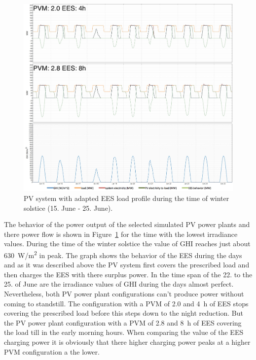 \begin{figure}[!bhtp]  
\centering
\includegraphics[width=1\linewidth]{FIG/PV_winter_load}
\caption[PV system with adapted EES load profile during the time of winter solstice (15. June - 25. June).]{PV system with adapted EES load profile during the time of winter solstice (15. June - 25. June).}\label{PV_winter_load}
\end{figure}
The behavior of the power output of the selected simulated PV power plants and there power flow is shown in Figure~\ref{PV_winter_load} for the time with the lowest irradiance values. During the time of the winter solstice the value of GHI reaches just about 630~W/m\textsuperscript{2} in peak. The graph shows the behavior of the EES during the days and as it was described above the PV system first covers the prescribed load and then charges the EES with there surplus power. In the time span of the 22. to the 25. of June are the irradiance values of GHI during the days almost perfect. Nevertheless, both PV power plant configurations can't produce power without coming to standstill. The configuration with a PVM of 2.0 and 4~h of EES stops covering the prescribed load before this steps down to the night reduction. But the PV power plant configuration with a PVM of 2.8 and 8~h of EES covering the load till in the early morning hours. When comparing the value of the EES charging power it is obviously that there higher charging power peaks at a higher PVM configuration a the lower. 

